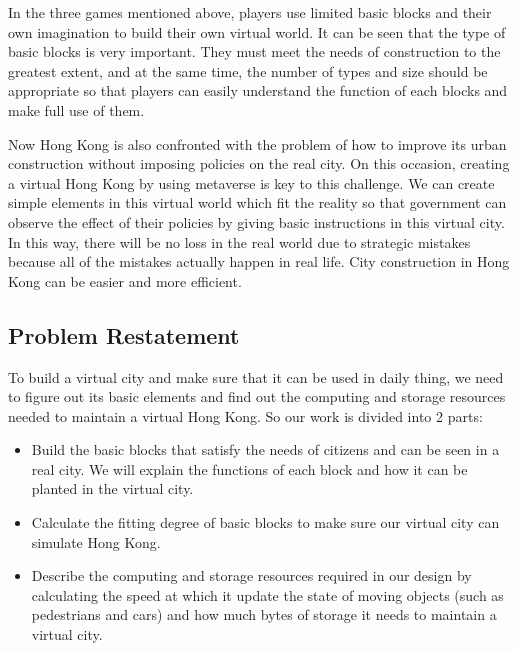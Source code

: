 \documentclass[12pt]{article}
\theoremstyle{definition}
\theoremstyle{remark}
\numberwithin{equation}{section}
\begin{document}
		In the three games mentioned above, players use limited basic blocks and their own imagination to build their own virtual world. It can be seen that the type of basic blocks is very important. They must meet the needs of construction to the greatest extent, and at the same time, the number of types and size should be appropriate so that players can easily understand the function of each blocks and make full use of them.
	
		Now Hong Kong is also confronted with the problem of how to improve its urban construction without imposing policies on the real city. On this occasion, creating a virtual Hong Kong by using metaverse is key to this challenge. We can create simple elements in this virtual world which fit the reality so that government can observe the effect of their policies by giving basic instructions in this virtual city. In this way, there will be no loss in the real world due to strategic mistakes because all of the mistakes actually happen in real life. City construction in Hong Kong can be easier and more efficient.
	
	\subsection{Problem Restatement}
		To build a virtual city and make sure that it can be used in daily thing, we need to figure out its basic elements and find out the computing and storage resources needed to maintain a virtual Hong Kong. So our work is divided into 2 parts:
		
		\begin{itemize}
			\item Build the basic blocks that satisfy the needs of citizens and can be seen in a real city. We will explain the functions of each block and how it can be planted in the virtual city.
			\item Calculate the fitting degree of basic blocks to make sure our virtual city can simulate Hong Kong.
			\item Describe the computing and storage resources required in our design by calculating the speed at which it update the state of moving objects (such as pedestrians and cars) and how much bytes of storage it needs to maintain a virtual city.
		\end{itemize}
\end{document}
